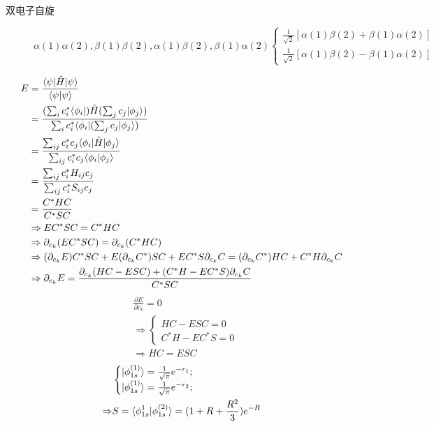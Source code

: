 \begin{description}
	\item[双电子自旋]
	\begin{equation}
	\alpha(1)\alpha(2),\beta(1)\beta(2),\alpha(1)\beta(2),\beta(1)\alpha(2)
	\begin{cases}
	\frac{1}{\sqrt{2}}[\alpha(1)\beta(2)+\beta(1)\alpha(2)]\\
	\frac{1}{\sqrt{2}}[\alpha(1)\beta(2)-\beta(1)\alpha(2)]
	\end{cases}
	\end{equation}

\end{description}

\begin{align*}
E&=\frac{\langle \psi | \hat{H} | \psi \rangle}{\langle \psi | \psi \rangle}\\
&=\frac{(\sum_ic_i^*\langle \phi_i |)\hat{H}(\sum_jc_j| \phi_j \rangle)}{\sum_ic_i^*\langle \phi_i |(\sum_jc_j| \phi_j \rangle)}\\
&=\frac{\sum_{ij}c_i^*c_j\langle \phi_i | \hat{H} | \phi_j \rangle}{\sum_{ij}c_i^*c_j\langle \phi_i | \phi_j \rangle}\\
&=\frac{\sum_{ij}c_i^*H_{ij}c_j}{\sum_{ij}c_i^*S_{ij}c_j}\\
&=\frac{C^*HC}{C^*SC}\\
&\Rightarrow EC^*SC=C^*HC\\
&\Rightarrow \partial_{c_k}(EC^*SC)=\partial_{c_k}(C^*HC)\\
&\Rightarrow (\partial_{c_k}E) C^*SC+E(\partial_{c_k}C^*)SC+EC^*S\partial_{c_k}C=(\partial_{c_k}C^*)HC+C^*H\partial_{c_k}C\\
&\Rightarrow \partial_{c_k}E = \frac{\partial_{c_k}(HC-ESC)+(C^*H-EC^*S)\partial_{c_k}C}{C^*SC}
\end{align*}
\begin{align*}
&\frac{\partial E}{\partial c_k}=0\\
&\Rightarrow 
\begin{cases}
HC-ESC=0\\
C^*H-EC^*S=0
\end{cases}\\
&\Rightarrow HC=ESC
\end{align*}
\begin{align}
&\begin{cases}
| \phi_{1s}^{(1)} \rangle=\frac{1}{\sqrt{\pi}}e^{-r_1};\\
| \phi_{1s}^{(1)} \rangle=\frac{1}{\sqrt{\pi}}e^{-r_2};
\end{cases}\\
\Rightarrow& S=\langle \phi_{1s}^{1} | \phi_{1s}^{(2)} \rangle=(1+R+\frac{R^2}{3})e^{-R}
\end{align}

